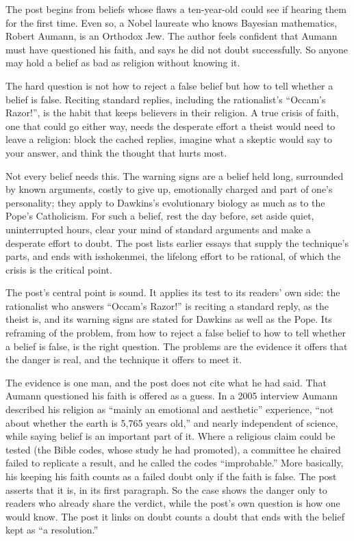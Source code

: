 \begin{afterword}
\summaryhead

The post begins from beliefs whose flaws a ten-year-old could see if hearing them for the first time. Even so, a Nobel laureate who knows Bayesian mathematics, Robert Aumann, is an Orthodox Jew. The author feels confident that Aumann must have questioned his faith, and says he did not doubt successfully. So anyone may hold a belief as bad as religion without knowing it.

The hard question is not how to reject a false belief but how to tell whether a belief is false. Reciting standard replies, including the rationalist's ``Occam's Razor!'', is the habit that keeps believers in their religion. A true crisis of faith, one that could go either way, needs the desperate effort a theist would need to leave a religion: block the cached replies, imagine what a skeptic would say to your answer, and think the thought that hurts most.

Not every belief needs this. The warning signs are a belief held long, surrounded by known arguments, costly to give up, emotionally charged and part of one's personality; they apply to Dawkins's evolutionary biology as much as to the Pope's Catholicism. For such a belief, rest the day before, set aside quiet, uninterrupted hours, clear your mind of standard arguments and make a desperate effort to doubt. The post lists earlier essays that supply the technique's parts, and ends with isshokenmei, the lifelong effort to be rational, of which the crisis is the critical point.

\responsehead

The post's central point is sound. It applies its test to its readers' own side: the rationalist who answers ``Occam's Razor!'' is reciting a standard reply, as the theist is, and its warning signs are stated for Dawkins as well as the Pope. Its reframing of the problem, from how to reject a false belief to how to tell whether a belief is false, is the right question. The problems are the evidence it offers that the danger is real, and the technique it offers to meet it.

The evidence is one man, and the post does not cite what he had said. That Aumann questioned his faith is offered as a guess. In a 2005 interview Aumann described his religion as ``mainly an emotional and aesthetic'' experience, ``not about whether the earth is 5,765 years old,'' and nearly independent of science, while saying belief is an important part of it. Where a religious claim could be tested (the Bible codes, whose study he had promoted), a committee he chaired failed to replicate a result, and he called the codes ``improbable.'' More basically, his keeping his faith counts as a failed doubt only if the faith is false. The post asserts that it is, in its first paragraph. So the case shows the danger only to readers who already share the verdict, while the post's own question is how one would know. The post it links on doubt counts a doubt that ends with the belief kept as ``a resolution.''


\end{afterword}
